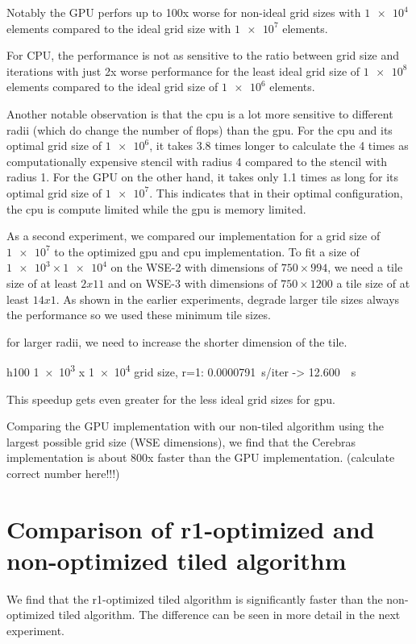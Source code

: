 Notably the GPU perfors up to 100x worse for non-ideal grid sizes with $\num{1e4}$ elements compared to the ideal grid size with $\num{1e7}$ elements.

For CPU, the performance is not as sensitive to the ratio between grid size and iterations with just 2x worse performance for the least ideal grid size of $\num{1e8}$ elements compared to the ideal grid size of $\num{1e6}$ elements.

Another notable observation is that the cpu is a lot more sensitive to different radii (which do change the number of flops) than the gpu. For the cpu and its optimal grid size of $\num{1e6}$, it takes 3.8 times longer to calculate the 4 times as computationally expensive stencil with radius 4 compared to the stencil with radius 1. For the GPU on the other hand, it takes only 1.1 times as long for its optimal grid size of $\num{1e7}$.
This indicates that in their optimal configuration, the cpu is compute limited while the gpu is memory limited.

As a second experiment, we compared our implementation for a grid size of $\num{1e7}$ to the optimized gpu and cpu implementation. To fit a size of $\num{1e3}\times\num{1e4}$ on the WSE-2 with dimensions of $750\times994$, we need a tile size of at least $2x11$ and on WSE-3 with dimensions of $750\times1200$ a tile size of at least $14x1$. As shown in the earlier experiments, degrade larger tile sizes always the performance so we used these minimum tile sizes.

for larger radii, we need to increase the shorter dimension of the tile.

h100 \num{1e3} x \num{1e4} grid size, r=1: \qty{0.0000791}{\second/iter} -> \qty{12.600}{\per\second}

This speedup gets even greater for the less ideal grid sizes for gpu.

Comparing the GPU implementation with our non-tiled algorithm using the largest possible grid size (WSE dimensions), we find that the Cerebras implementation is about 800x faster than the GPU implementation. (calculate correct number here!!!)

\section{Comparison of r1-optimized and non-optimized tiled algorithm}
We find that the r1-optimized tiled algorithm is significantly faster than the non-optimized tiled algorithm.
The difference can be seen in more detail in the next experiment.

